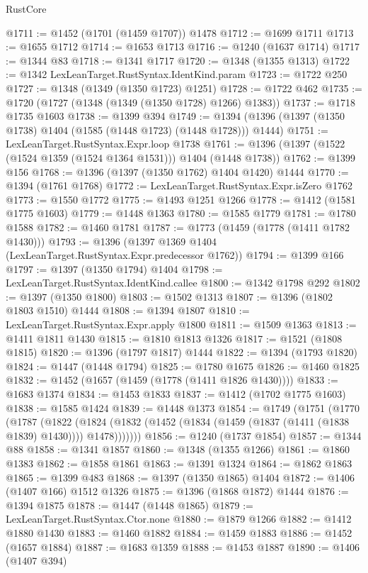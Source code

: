 \begin{lexlean}{RustCore}
\begin{coremodule}
@1711 := @1452 (@1701 (@1459 @1707)) @1478
@1712 := @1699 @1711
@1713 := @1655 @1712
@1714 := @1653 @1713
@1716 := @1240 (@1637 @1714)
@1717 := @1344 @83
@1718 := @1341 @1717
@1720 := @1348 (@1355 @1313)
@1722 := @1342 LexLeanTarget.RustSyntax.IdentKind.param
@1723 := @1722 @250
@1727 := @1348 (@1349 (@1350 @1723) @1251)
@1728 := @1722 @462
@1735 := @1720 (@1727 (@1348 (@1349 (@1350 @1728) @1266) @1383))
@1737 := @1718 @1735 @1603
@1738 := @1399 @394
@1749 := @1394 (@1396 (@1397 (@1350 @1738) @1404 (@1585 (@1448 @1723) (@1448 @1728))) @1444)
@1751 := LexLeanTarget.RustSyntax.Expr.loop @1738
@1761 := @1396 (@1397 (@1522 (@1524 @1359 (@1524 @1364 @1531))) @1404 (@1448 @1738))
@1762 := @1399 @156
@1768 := @1396 (@1397 (@1350 @1762) @1404 @1420) @1444
@1770 := @1394 (@1761 @1768)
@1772 := LexLeanTarget.RustSyntax.Expr.isZero @1762
@1773 := @1550 @1772
@1775 := @1493 @1251 @1266
@1778 := @1412 (@1581 @1775 @1603)
@1779 := @1448 @1363
@1780 := @1585 @1779
@1781 := @1780 @1588
@1782 := @1460 @1781
@1787 := @1773 (@1459 (@1778 (@1411 @1782 @1430)))
@1793 := @1396 (@1397 @1369 @1404 (LexLeanTarget.RustSyntax.Expr.predecessor @1762))
@1794 := @1399 @166
@1797 := @1397 (@1350 @1794) @1404
@1798 := LexLeanTarget.RustSyntax.IdentKind.callee
@1800 := @1342 @1798 @292
@1802 := @1397 (@1350 @1800)
@1803 := @1502 @1313
@1807 := @1396 (@1802 @1803 @1510) @1444
@1808 := @1394 @1807
@1810 := LexLeanTarget.RustSyntax.Expr.apply @1800
@1811 := @1509 @1363
@1813 := @1411 @1811 @1430
@1815 := @1810 @1813 @1326
@1817 := @1521 (@1808 @1815)
@1820 := @1396 (@1797 @1817) @1444
@1822 := @1394 (@1793 @1820)
@1824 := @1447 (@1448 @1794)
@1825 := @1780 @1675
@1826 := @1460 @1825
@1832 := @1452 (@1657 (@1459 (@1778 (@1411 @1826 @1430))))
@1833 := @1683 @1374
@1834 := @1453 @1833
@1837 := @1412 (@1702 @1775 @1603)
@1838 := @1585 @1424
@1839 := @1448 @1373
@1854 := @1749
    (@1751
      (@1770
        (@1787
          (@1822
            (@1824 (@1832 (@1452 (@1834 (@1459 (@1837 (@1411 (@1838 @1839) @1430)))) @1478)))))))
@1856 := @1240 (@1737 @1854)
@1857 := @1344 @88
@1858 := @1341 @1857
@1860 := @1348 (@1355 @1266)
@1861 := @1860 @1383
@1862 := @1858 @1861
@1863 := @1391 @1324
@1864 := @1862 @1863
@1865 := @1399 @483
@1868 := @1397 (@1350 @1865) @1404
@1872 := @1406 (@1407 @166) @1512 @1326
@1875 := @1396 (@1868 @1872) @1444
@1876 := @1394 @1875
@1878 := @1447 (@1448 @1865)
@1879 := LexLeanTarget.RustSyntax.Ctor.none
@1880 := @1879 @1266
@1882 := @1412 @1880 @1430
@1883 := @1460 @1882
@1884 := @1459 @1883
@1886 := @1452 (@1657 @1884)
@1887 := @1683 @1359
@1888 := @1453 @1887
@1890 := @1406 (@1407 @394)

\end{coremodule}
\end{lexlean}
